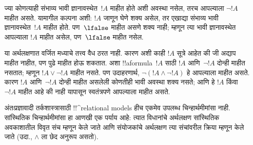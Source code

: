 \documentclass[../../../include/open-logic-section]{subfiles}
\begin{document}
ज्या कोणत्याही संभाव्य भावी ज्ञानावस्थेत~$!A$
माहीत होते अशी अवस्था नसेल, तरच आपल्याला
$\lnot !A$ माहीत असते. यामागील कल्पना अशी:
$!A$ जाणून घेणे शक्य असेल, तर एखाद्या
संभाव्य भावी ज्ञानावस्थेत~$!A$ माहीत होते.
पण~$\lfalse$ माहीत असणे शक्य नाही; म्हणून
त्या भावी ज्ञानावस्थेत आपल्याला $!A$ माहीत
असेल, पण~$\lfalse$ माहीत नसेल.

या अर्थलक्षणात वर्जित मध्याचे तत्त्व वैध ठरत नाही.
कारण अशी काही $!A$ सूत्रे आहेत की जी अद्याप
माहीत नाहीत, पण पुढे माहीत होऊ शकतात.
अशा !!a{formula}~$!A$ साठी $!A$ आणि~$\lnot !A$
दोन्ही माहीत नसतात; म्हणून $!A \lor \lnot !A$
माहीत नसते. पण उदाहरणार्थ, $\lnot(!A
\land \lnot !A)$ हे आपल्याला माहीत असते.
कारण $!A$ आणि~$\lnot !A$ दोन्ही माहीत असलेली
कोणतीही भावी अवस्था शक्य नसते; आणि हे
$!A$ किंवा~$\lnot !A$ माहीत आहे की नाही
यापासून स्वतंत्रपणे आपल्याला माहीत असते.

अंतःप्रज्ञावादी तर्कशास्त्रासाठी !!^{relational model}s
हीच एकमेव उपलब्ध चिन्हार्थमीमांसा नाही.
सांस्थितिक चिन्हार्थमीमांसा हा आणखी एक पर्याय आहे:
त्यात विधानांचे अर्थलक्षण सांस्थितिक अवकाशातील
विवृत संच म्हणून केले जाते आणि संयोजकांचे
अर्थलक्षण त्या संचांवरील क्रिया म्हणून केले जाते
(उदा., $\land$ ला छेद अनुरूप असतो).
\end{document}
